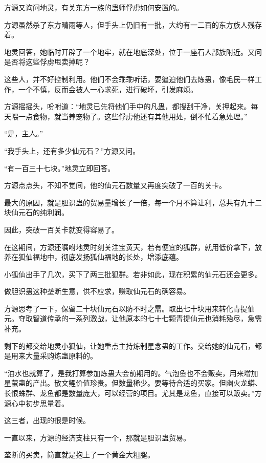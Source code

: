 
\begin{this_body}

方源又询问地灵，有关东方一族的蛊师俘虏如何安置的。

方源虽然杀了东方晴雨等人，但手头上仍旧有一批，大约有一二百的东方族人残存着。

地灵回答，她临时开辟了一个地牢，就在地底深处，位于一座石人部族附近。又问是否将这些俘虏甩卖掉呢？

这些人，并不好控制利用。他们不会乖乖听话，要逼迫他们去炼蛊，像毛民一样工作，一个不慎，反而会被人一心求死，进行破坏，引发麻烦。

方源摇摇头，吩咐道：“地灵已先将他们手中的凡蛊，都搜刮干净，关押起来。每天喂一点食物，就当养宠物了。这些俘虏他还有其他用处，倒不忙着急处理。”

“是，主人。”

“我手头上，还有多少仙元石？”方源又问。

“有一百三十七块。”地灵立即回答。

方源点点头，不知不觉间，他的仙元石数量又再度突破了一百的关卡。

最大的原因，就是胆识蛊的贸易量增长了一倍，每一个月不算让利，总共有九十二块仙元石的纯利润。

因此，突破一百关卡就变得容易了。

在这期间，方源还嘱咐地灵时刻关注宝黄天，若有便宜的狐群，就用低价拿下，放养在狐仙福地中，彻底发扬狐仙福地的长处，增添底蕴。

小狐仙出手了几次，买下了两三批狐群。若非如此，现在积累的仙元石还会更多。

做胆识蛊这种垄断生意，供不应求，赚取仙元石的确容易。

方源思考了一下，保留二十块仙元石以防不时之需。取出七十块用来转化青提仙元。夺取智道传承的一系列激战，让他原本的七十七颗青提仙元也消耗殆尽，急需补充。

剩下的都交给地灵小狐仙，让她重点主持炼制星念蛊的工作。交给她的仙元石，都是用来大量采购炼蛊原料的。

“油水也就算了，是我打算参加炼蛊大会前期用的。气泡鱼也不会贩卖，用来增加星萤蛊的产出。散文鲤价值珍贵。但数量稀少。要等待合适的买家。但幽火龙蟒、长恨蛛群、龙鱼都是数量庞大，可以经营的项目。尤其是龙鱼，直接可以贩卖。”方源心中初步思量着。

这三者，出现的很是时候。

一直以来，方源的经济支柱只有一个，那就是胆识蛊贸易。

垄断的买卖，简直就是抱上了一个黄金大粗腿。


\end{this_body}
